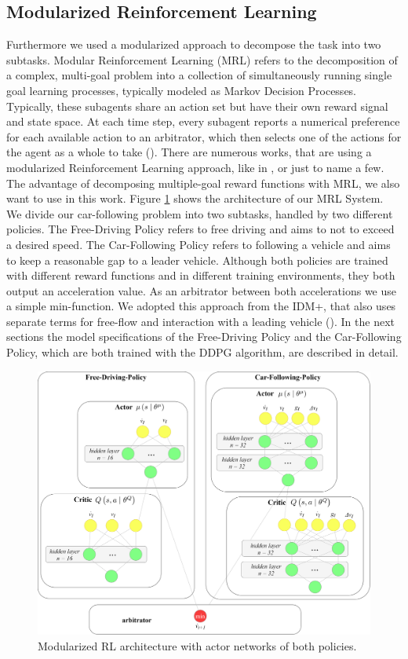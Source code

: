 \documentclass[review]{elsarticle}
\providecommand{\3}{{\ss}}
\begin{document}
  
  \subsection{\label{MRL}Modularized Reinforcement Learning}
  Furthermore we used a modularized approach to decompose the task into two subtasks. Modular Reinforcement Learning (MRL) refers to the decomposition of a complex, multi-goal
  problem into a collection of simultaneously running single goal learning processes, typically modeled as Markov Decision Processes. Typically, these subagents share an action
  set but have their own reward signal and state space. At each
  time step, every subagent reports a numerical preference for
  each available action to an arbitrator, which then selects one
  of the actions for the agent as a whole to take (\cite{MRL}). There are numerous works, that are using a modularized Reinforcement Learning approach, like in \cite{MRLexample1}, \cite{MRLexample2} or \cite{MRLexample3} just to name a few. The advantage of decomposing multiple-goal reward functions with MRL, we also want to use in this work. 
  Figure \ref{fig:MRL} shows the architecture of our MRL System. We divide our car-following problem into two subtasks, handled by two different policies. The Free-Driving Policy refers to free driving and aims to not to exceed a desired speed. The Car-Following Policy refers to following a vehicle and aims to keep a reasonable gap to a leader vehicle. Although both policies are trained with different reward functions and in different training environments, they both output an acceleration value. As an arbitrator between both accelerations we use a simple min-function. We adopted this approach from the IDM+, that also uses separate terms for free-flow and interaction with a leading vehicle (\cite{idm_plus}). In the next sections the model specifications of the Free-Driving Policy and the Car-Following Policy, which are both trained with the DDPG algorithm, are described in detail.
  
  \begin{figure}
  	\centering
  	\includegraphics[width=12cm]{images/MRL_small}
  	\caption{Modularized RL architecture with actor networks of both policies.} 
  	\label{fig:MRL}
  \end{figure}
\end{document}

